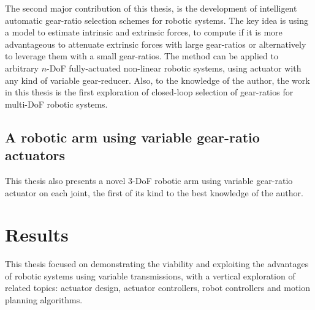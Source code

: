 The second major contribution of this thesis, is the development of intelligent automatic gear-ratio selection schemes for robotic systems. The key idea is using a model to estimate intrinsic and extrinsic forces, to compute if it is more advantageous to attenuate extrinsic forces with large gear-ratios or alternatively to leverage them with a small gear-ratios. The method can be applied to arbitrary $n$-DoF fully-actuated non-linear robotic systems, using actuator with any kind of variable gear-reducer. Also, to the knowledge of the author, the work in this thesis is the first exploration of closed-loop selection of gear-ratios for multi-DoF robotic systems.



\subsection{A robotic arm using variable gear-ratio actuators}

This thesis also presents a novel 3-DoF robotic arm using variable gear-ratio actuator on each joint, the first of its kind to the best knowledge of the author. %

\newpage

\section{Results}
\label{sec:mainresults}


This thesis focused on demonstrating the viability and exploiting the advantages of robotic systems using variable transmissions, with a vertical exploration of related topics: actuator design, actuator controllers, robot controllers and motion planning algorithms.


